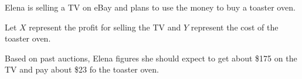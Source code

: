 \documentclass{beamer}
\begin{document}
\begin{frame}
\begin{example}\label{elena ebay}
\vspace{-2mm}%
Elena is selling a TV on eBay and plans to use the money to buy a toaster oven.\pause

\vspace{1mm}
Let $X$ represent the profit for selling the TV and $Y$ represent the cost of the toaster oven.\pause

\vspace{1mm}
\pause
{}\pause

\vspace{1mm}
Based on past auctions, Elena figures she should expect to get about \$175 on the TV and pay about \$23 fo the toaster oven.\pause

\vspace{1mm}
\pause
{}
\end{example}
\end{frame}
\end{document}
